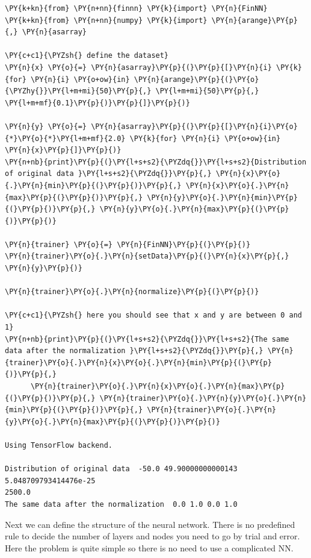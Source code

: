     \begin{tcolorbox}[breakable, size=fbox, boxrule=1pt, pad at break*=1mm,colback=cellbackground, colframe=cellborder]
\begin{Verbatim}[commandchars=\\\{\}]
\PY{k+kn}{from} \PY{n+nn}{finnn} \PY{k}{import} \PY{n}{FinNN}
\PY{k+kn}{from} \PY{n+nn}{numpy} \PY{k}{import} \PY{n}{arange}\PY{p}{,} \PY{n}{asarray}

\PY{c+c1}{\PYZsh{} define the dataset}
\PY{n}{x} \PY{o}{=} \PY{n}{asarray}\PY{p}{(}\PY{p}{[}\PY{n}{i} \PY{k}{for} \PY{n}{i} \PY{o+ow}{in} \PY{n}{arange}\PY{p}{(}\PY{o}{\PYZhy{}}\PY{l+m+mi}{50}\PY{p}{,} \PY{l+m+mi}{50}\PY{p}{,} \PY{l+m+mf}{0.1}\PY{p}{)}\PY{p}{]}\PY{p}{)}

\PY{n}{y} \PY{o}{=} \PY{n}{asarray}\PY{p}{(}\PY{p}{[}\PY{n}{i}\PY{o}{*}\PY{o}{*}\PY{l+m+mf}{2.0} \PY{k}{for} \PY{n}{i} \PY{o+ow}{in} \PY{n}{x}\PY{p}{]}\PY{p}{)}
\PY{n+nb}{print}\PY{p}{(}\PY{l+s+s2}{\PYZdq{}}\PY{l+s+s2}{Distribution of original data }\PY{l+s+s2}{\PYZdq{}}\PY{p}{,} \PY{n}{x}\PY{o}{.}\PY{n}{min}\PY{p}{(}\PY{p}{)}\PY{p}{,} \PY{n}{x}\PY{o}{.}\PY{n}{max}\PY{p}{(}\PY{p}{)}\PY{p}{,} \PY{n}{y}\PY{o}{.}\PY{n}{min}\PY{p}{(}\PY{p}{)}\PY{p}{,} \PY{n}{y}\PY{o}{.}\PY{n}{max}\PY{p}{(}\PY{p}{)}\PY{p}{)}

\PY{n}{trainer} \PY{o}{=} \PY{n}{FinNN}\PY{p}{(}\PY{p}{)}
\PY{n}{trainer}\PY{o}{.}\PY{n}{setData}\PY{p}{(}\PY{n}{x}\PY{p}{,} \PY{n}{y}\PY{p}{)}

\PY{n}{trainer}\PY{o}{.}\PY{n}{normalize}\PY{p}{(}\PY{p}{)}

\PY{c+c1}{\PYZsh{} here you should see that x and y are between 0 and 1}
\PY{n+nb}{print}\PY{p}{(}\PY{l+s+s2}{\PYZdq{}}\PY{l+s+s2}{The same data after the normalization }\PY{l+s+s2}{\PYZdq{}}\PY{p}{,} \PY{n}{trainer}\PY{o}{.}\PY{n}{x}\PY{o}{.}\PY{n}{min}\PY{p}{(}\PY{p}{)}\PY{p}{,} 
      \PY{n}{trainer}\PY{o}{.}\PY{n}{x}\PY{o}{.}\PY{n}{max}\PY{p}{(}\PY{p}{)}\PY{p}{,} \PY{n}{trainer}\PY{o}{.}\PY{n}{y}\PY{o}{.}\PY{n}{min}\PY{p}{(}\PY{p}{)}\PY{p}{,} \PY{n}{trainer}\PY{o}{.}\PY{n}{y}\PY{o}{.}\PY{n}{max}\PY{p}{(}\PY{p}{)}\PY{p}{)}

Using TensorFlow backend.

Distribution of original data  -50.0 49.90000000000143 5.048709793414476e-25
2500.0
The same data after the normalization  0.0 1.0 0.0 1.0
    \end{Verbatim}
\end{tcolorbox}

    Next we can define the structure of the neural network. There is no
predefined rule to decide the number of layers and nodes you need to go
by trial and error. Here the problem is quite simple so there is no need
to use a complicated NN.


